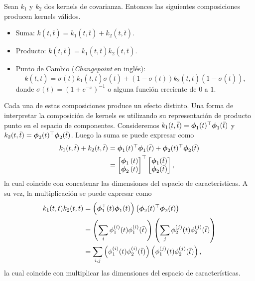 \begin{proposition}
	Sean \(k_{1}\) y \(k_{2}\) dos kernels de covarianza. Entonces las siguientes composiciones producen kernels válidos.
	\begin{itemize}
		\item Suma: \(k(t, \bar{t}) = k_{1}(t, \bar{t}) + k_{2}(t, \bar{t})\).
		\item Producto: \(k(t, \bar{t}) = k_{1}(t, \bar{t}) k_{2}(t, \bar{t})\).
		\item Punto de Cambio (\emph{Changepoint} en inglés):
		\[k(t, \bar{t}) = \sigma(t) k_{1}(t, \bar{t}) \sigma(\bar{t}) + (1-\sigma(t)) k_{2}(t, \bar{t}) (1 - \sigma(\bar{t})),\]
		donde \(\sigma(t) = (1 + e^{-x})^{-1}\) o alguna función creciente de \(0\) a \(1\).
	\end{itemize}
\end{proposition}

Cada una de estas composiciones produce un efecto distinto. Una forma de interpretar la composición de kernels es utilizando su representación de producto punto en el espacio de componentes. Consideremos \(k_{1}(t, \bar{t}) = \boldsymbol{\phi}_{1}(t)^{\top} \boldsymbol{\phi}_{1}(\bar{t})\) y \(k_{2}(t, \bar{t}) = \boldsymbol{\phi}_{2}(t)^{\top} \boldsymbol{\phi}_{2}(\bar{t})\). Luego la suma se puede expresar como
\begin{align*}
	k_{1}(t, \bar{t}) + k_{2}(t, \bar{t})	&= \boldsymbol{\phi}_{1}(t)^{\top} \boldsymbol{\phi}_{1}(\bar{t}) + \boldsymbol{\phi}_{2}(t)^{\top} \boldsymbol{\phi}_{2}(\bar{t}) \\
											&= \begin{bmatrix} \boldsymbol{\phi}_{1}\left(t\right) \\ \boldsymbol{\phi}_{2}\left(t\right) \end{bmatrix}^{\top} \begin{bmatrix} \boldsymbol{\phi}_{1}(\bar{t}) \\ \boldsymbol{\phi}_{2}(\bar{t}) \end{bmatrix},
\end{align*}
la cual coincide con concatenar las dimensiones del espacio de características. A su vez, la multiplicación se puede expresar como
\begin{align*}
	k_{1}(t, \bar{t}) k_{2}(t, \bar{t})	&= \left( \boldsymbol{\phi}_{1}^{\top}(t) \boldsymbol{\phi}_{1}(\bar{t}) \right) \left(\boldsymbol{\phi}_{2}(t)^{\top} \boldsymbol{\phi}_{2}(\bar{t}) \right) \\
										&= \left(\sum_{i} \phi_{1}^{(i)}(t) \phi_{1}^{(i)}(\bar{t})\right) \left(\sum_{j} \phi_{2}^{(j)}(t) \phi_{2}^{(j)}(\bar{t})\right) \\
										&= \sum_{i, j} \left(\phi_{1}^{(i)}(t) \phi_{2}^{(i)}(\bar{t})\right) \left(\phi_{1}^{(j)}(t) \phi_{2}^{(j)}(\bar{t}) \right),
\end{align*}
la cual coincide con multiplicar las dimensiones del espacio de características.

